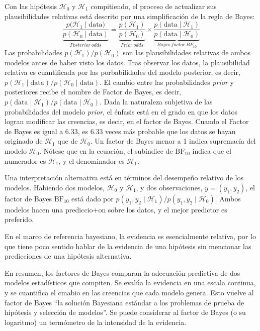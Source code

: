 \documentclass[a4paper,12pt]{article}
\begin{document}
Con las hipótesis $\mathcal H_0$ y $\mathcal H_1$ compitiendo, el proceso de actualizar sus plausibilidades relativas está descrito por una simplificación de la regla de Bayes:
$$\underbrace{\frac{p(\mathcal H_1 \mid \mbox{data)}}{p(\mathcal H_0 \mid \mbox{data})}}_{Posterior\ odds}=\underbrace{\frac{p(\mathcal H_1)}{p(\mathcal H_0)}}_{Prior\ odds} \times \underbrace{\frac{p(\mbox{data} \mid \mathcal H_1)}{p(\mbox{data}\mid \mathcal H_0)}}_{Bayes\ factor\ BF_{10}}$$
Las probabilidades $p(\mathcal H_1)/p(\mathcal H_0)$ son las plausibilidades relativas de ambos modelos antes de haber visto los datos. Tras observar los datos, la plausibilidad relativa es cuantificada por las porbabilidades del modelo posterior, es decir, $p(\mathcal H_1 \mid \mbox{data})/p(\mathcal H_0 \mid \mbox{data})$. El cambio entre las probabilidades {\slshape prior} y posteriores recibe el nombre de Factor de Bayes, es decir, $p(\mbox{data} \mid \mathcal H_1)/p(\mbox{data} \mid \mathcal H_0)$. Dada la naturaleza subjetiva de las probabilidades del modelo {\slshape prior}, el énfasis está en el grado en que los datos logran modificar las creencias, es decir, en el factor de Bayes. Cuando el Factor de Bayes es igual a 6.33, es 6.33 veces más probable que los datos se hayan originado de $\mathcal H_1$ que de $\mathcal H_0$. Un factor de Bayes menor a 1 indica supremacía del modelo $\mathcal H_0$. Nótese que en la ecuación, el subíndice de $\mbox{BF}_{10}$ indica que el numerador es $\mathcal H_1$, y el denominador es $\mathcal H_1$.

Una interpretación alternativa está en términos del desempeño relativo de los modelos. Habiendo dos modelos, $\mathcal H_0 \mbox{ y } \mathcal H_1$, y dos observaciones, $y = (y_1, y_2)$, el factor de Bayes $\mbox{BF}_{10}$ está dado por $p(y_1, y_2 \mid \mathcal H_1)/p(y_1, y_2 \mid \mathcal H_0)$. Ambos modelos hacen una prediccio+on sobre los datos, y el mejor predictor es preferido.

En el marco de referencia bayesiano, la evidencia es esencialmente relativa, por lo que tiene poco sentido hablar de la evidencia de una hipótesis sin mencionar las predicciones de una hipótesis alternativa.

En resumen, los factores de Bayes comparan la adecuación predictiva de dos modelos estadísticos que compiten. Se evalúa la evidencia en una escala continua, y se cuantifica el cmabio en las creencias que cada modelo genera. Esto vuelve al factor de Bayes ``la solución Bayesiana estándar a los problemas de prueba de hipótesis y selección de modelos''. Se puede considerar al factor de Bayes (o su logaritmo) un termómetro de la intensidad de la evidencia.
\end{document}
